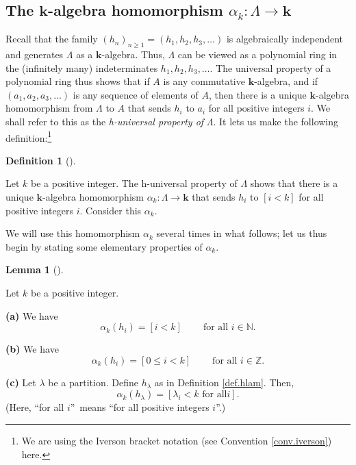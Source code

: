 \documentclass[numbers=enddot,12pt,final,onecolumn,notitlepage]{scrartcl}%
\theoremstyle{definition}
\newtheorem{lem}[theo]{Lemma}
\newenvironment{lemma}[1][]
{\begin{lem}[#1]\begin{leftbar}}
{\end{leftbar}\end{lem}}
\newtheorem{defi}[theo]{Definition}
\newenvironment{definition}[1][]
{\begin{defi}[#1]\begin{leftbar}}
{\end{leftbar}\end{defi}}
\begin{document}
\subsection{\label{subsect.proofs.petk.alphak}The $\mathbf{k}$-algebra
homomorphism $\alpha_{k}:\Lambda\rightarrow\mathbf{k}$}

Recall that the family $\left(  h_{n}\right)  _{n\geq1}=\left(  h_{1}%
,h_{2},h_{3},\ldots\right)  $ is algebraically independent and generates
$\Lambda$ as a $\mathbf{k}$-algebra. Thus, $\Lambda$ can be viewed as a
polynomial ring in the (infinitely many) indeterminates $h_{1},h_{2}%
,h_{3},\ldots$. The universal property of a polynomial ring thus shows that if
$A$ is any commutative $\mathbf{k}$-algebra, and if $\left(  a_{1},a_{2}%
,a_{3},\ldots\right)  $ is any sequence of elements of $A$, then there is a
unique $\mathbf{k}$-algebra homomorphism from $\Lambda$ to $A$ that sends
$h_{i}$ to $a_{i}$ for all positive integers $i$. We shall refer to this as
the \textit{h-universal property of }$\Lambda$. It lets us make the following
definition:\footnote{We are using the Iverson bracket notation (see Convention
\ref{conv.iverson}) here.}

\begin{definition}
\label{def.alphak}Let $k$ be a positive integer. The h-universal property of
$\Lambda$ shows that there is a unique $\mathbf{k}$-algebra homomorphism
$\alpha_{k}:\Lambda\rightarrow\mathbf{k}$ that sends $h_{i}$ to $\left[
i<k\right]  $ for all positive integers $i$. Consider this $\alpha_{k}$.
\end{definition}

We will use this homomorphism $\alpha_{k}$ several times in what follows; let
us thus begin by stating some elementary properties of $\alpha_{k}$.

\begin{lemma}
\label{lem.alphak.h}Let $k$ be a positive integer.

\textbf{(a)} We have%
\begin{equation}
\alpha_{k}\left(  h_{i}\right)  =\left[  i<k\right]
\ \ \ \ \ \ \ \ \ \ \text{for all }i\in\mathbb{N}. \label{pf.thm.G.main.alk}%
\end{equation}


\textbf{(b)} We have%
\begin{equation}
\alpha_{k}\left(  h_{i}\right)  =\left[  0\leq i<k\right]
\ \ \ \ \ \ \ \ \ \ \text{for all }i\in\mathbb{Z}. \label{pf.thm.G.main.alkZ}%
\end{equation}


\textbf{(c)} Let $\lambda$ be a partition. Define $h_{\lambda}$ as in
Definition \ref{def.hlam}. Then,%
\begin{equation}
\alpha_{k}\left(  h_{\lambda}\right)  =\left[  \lambda_{i}<k\text{ for all
}i\right]  . \label{pf.thm.G.main.alkh}%
\end{equation}
(Here, \textquotedblleft for all $i$\textquotedblright\ means
\textquotedblleft for all positive integers $i$\textquotedblright.)
\end{lemma}
\end{document}

